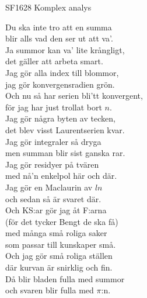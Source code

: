 \documentclass[a6paper, 10pt, twoside]{article}
\begin{document}
\noindent
\begin{center}
\footnotesize SF1628 Komplex analys\\
\end{center}
\begin{lyrics}
Du ska inte tro att en summa \\
blir alls vad den ser ut att va'. \\
Ja summor kan va' lite krångligt, \\
det gäller att arbeta smart. 
\vspace{5pt} \\
Jag gör alla index till blommor, \\
jag gör konvergensradien grön. \\
Och nu så har serien bli'tt konvergent, \\
för jag har just trollat bort $n$. 
\vspace{5pt} \\
Jag gör några byten av tecken, \\
det blev visst Laurentserien kvar. \\
Jag gör integraler så dryga \\
men summan blir sist ganska rar. 
\vspace{5pt} \\
Jag gör residyer på tvären \\
med nå'n enkelpol här och där. \\
Jag gör en Maclaurin av $ln$ \\
och sedan så är svaret där. 
\vspace{5pt} \\
Och KS:ar gör jag åt F:arna \\
(för det tycker Bengt de ska få) \\
med många små roliga saker \\
som passar till kunskaper små. 
\vspace{5pt} \\
Och jag gör små roliga ställen \\
där kurvan är snirklig och fin. \\
Då blir bladen fulla med summor \\
och svaren blir fulla med $\pi$:n.
\end{lyrics}
\end{document}
